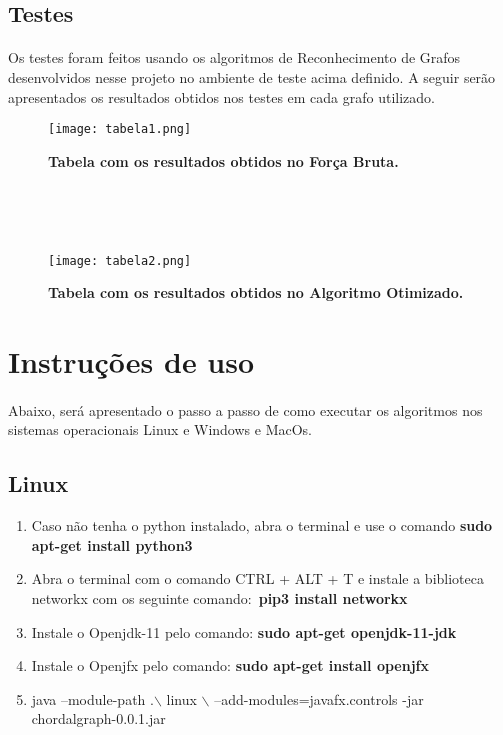 \documentclass[a4paper, 11pt]{article}
\begin{document}
			\subsection{Testes}
				\paragraph{}Os testes foram feitos usando os algoritmos de Reconhecimento de Grafos desenvolvidos nesse projeto no ambiente de teste acima definido. A seguir serão apresentados os resultados obtidos nos testes em cada grafo utilizado.
				
				\begin{figure}[H]
					\centering
					\texttt{[image: tabela1.png]}
					\caption{\textbf{Tabela com os resultados obtidos no Força Bruta.}}
					
					\ 
					
					\
					
					\texttt{[image: tabela2.png]}
					\centering
					\caption{\textbf{Tabela com os resultados obtidos no Algoritmo Otimizado.}}
				\end{figure}
				
				
		\section{Instruções de uso}
			\paragraph{}Abaixo, será apresentado o passo a passo de como executar os algoritmos nos sistemas operacionais Linux e Windows e MacOs.
			\subsection{Linux}
				\begin{enumerate}
					
					\item Caso não tenha o python instalado, abra o terminal e use o comando \textbf{sudo apt-get install python3}
					
					\item Abra o terminal com o comando CTRL + ALT + T e instale a biblioteca networkx com os seguinte comando:\ \textbf{pip3 install networkx}
					\item Instale o Openjdk-11 pelo comando:
					\textbf{sudo apt-get openjdk-11-jdk}
					\item Instale o Openjfx pelo comando:
					\textbf{sudo apt-get install openjfx}
					\item java --module-path .$\backslash$ linux $\backslash$ --add-modules=javafx.controls -jar chordalgraph-0.0.1.jar
					
					
					
					
				\end{enumerate}
\end{document}
